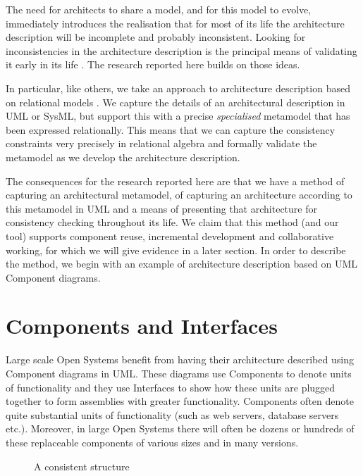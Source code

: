 \documentclass{llncs}
\begin{document}
The need for architects to share a model, and for this model to evolve, immediately introduces the realisation that for most of its life the architecture description will be incomplete and probably inconsistent. Looking for inconsistencies in the architecture description is the principal means of validating it early in its life \cite{Crocopat2,Chang,Koo,Hadar,Henderson3}. The research reported here builds on those ideas.

In particular, like others, we take an approach to architecture description based on relational models \cite{Holt,Crocopat2}. We capture the details of an architectural description in UML or SysML, but support this with a precise {\em specialised} metamodel that has been expressed relationally. This means that we can capture the consistency constraints very precisely in relational algebra \cite{Date,Crocopat} and formally validate the metamodel as we develop the architecture description. 

The consequences for the research reported here are that we have a method of capturing an architectural metamodel, of capturing an architecture according to this metamodel in UML and a means of presenting that architecture for consistency checking throughout its life. We claim that this method (and our tool) supports component reuse, incremental development and collaborative working, for which we will give evidence in a later section. In order to describe the method, we begin with an example of architecture description based on UML Component diagrams. 


\section{Components and Interfaces}

\noindent Large scale Open Systems benefit from having their architecture described using Component diagrams in UML. These diagrams use Components to denote units of functionality and they use Interfaces to show how these units are plugged together to form assemblies with greater functionality. Components often denote quite substantial units of functionality (such as web servers, database servers etc.). Moreover, in large Open Systems there will often be dozens or hundreds of these replaceable components of various sizes and in many versions.
% 
\begin{figure}[t]
  \centering
   {}
  \caption{A consistent structure}
  \label{fig:fig1}
\end{figure}
%
\end{document}
